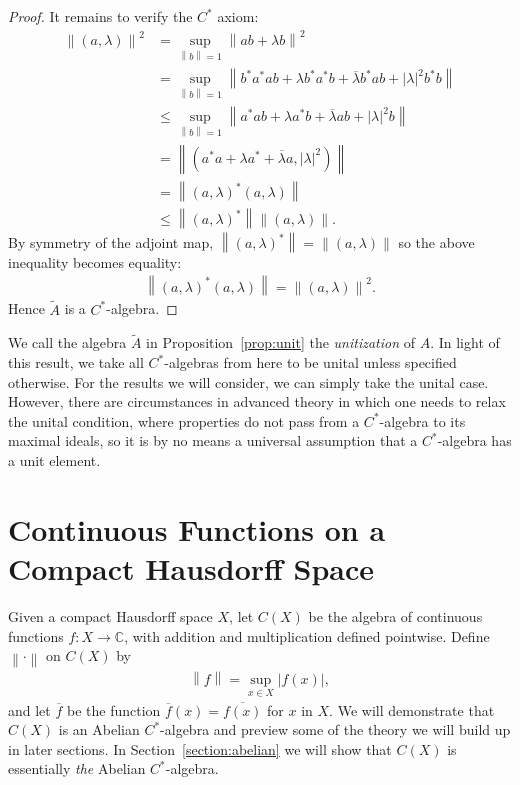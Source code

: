 \documentclass[11pt,a4paper]{report}
\theoremstyle{plain}
\theoremstyle{definition}
\newcommand{\1}{\mathbbm{1}}
\newcommand{\C}{\mathbb{C}}
\newcommand{\CX}{C(X)}
\begin{document}
\begin{proof}
	It remains to verify the $C^\ast$ axiom:
	\begin{align*}
				\left\|(a,\lambda)\right\|^2 
		&=		\sup_{\left\|b\right\|=1}{\left\| ab+\lambda b\right \|^2}						\\
		&=		\sup_{\left\|b\right\|=1}{\left\| b^\ast a^\ast ab 
								+\lambda b^\ast a^\ast b
								+\overline{\lambda}b^\ast a b 
								+|\lambda|^2 b^\ast b \right\|}									\\
		&\leq	\sup_{\left\|b\right\|=1}{\left\| a^\ast ab 
								+\lambda a^\ast b
								+\overline{\lambda}a b
								+\left|\lambda\right|^2 b\right\|}								\\
		&=		\left\|(a^\ast a + \lambda a^\ast +\overline{\lambda}a,|\lambda|^2)\right\|		\\
		&= 		\left\|(a,\lambda)^\ast(a,\lambda)\right\|										\\
		&\leq	\left\|(a,\lambda)^\ast\right\| \left\|(a,\lambda)\right\|.
	\end{align*}
	By symmetry of the adjoint map, $\left\|(a,\lambda)^\ast\right\| = \left\|(a,\lambda)\right\|$ 
	so the above inequality becomes equality:
	\begin{align*}
		\left\|(a,\lambda)^\ast(a,\lambda)\right\| = \left\|(a,\lambda)\right\|^2.
	\end{align*}
	Hence $\tilde A$ is a $C^\ast$-algebra.
\end{proof}

We call the algebra $\tilde A$ in Proposition~\ref{prop:unit} the \emph{unitization} of $A$.
In light of this result, we take all $C^\ast$-algebras from here to be unital 
unless specified otherwise. For the results we will consider, we can simply take 
the unital case. However, there are circumstances in advanced theory in which 
one needs to relax the unital condition, where properties do not pass from a 
$C^\ast$-algebra to its maximal ideals, so it is by no means a universal 
assumption that a $C^\ast$-algebra has a unit element.


\section{Continuous Functions on a Compact Hausdorff Space} \label{section:CX}
Given a compact Hausdorff space $X$, let $\CX$ be the algebra of continuous 
functions $f:X\to\C$, with addition and multiplication defined pointwise. 
Define $\left\|\cdot\right\|$ on $\CX$ by
\begin{align*}
	\left\|f\right\|= \sup_{x\in X}{\left|f(x)\right|},
\end{align*}
and let $\overline f$ be the function $\overline f(x) = \overline{f(x)}$ for 
$x$ in $X$. We will demonstrate that $\CX$ is an Abelian $C^\ast$-algebra and 
preview some of the theory we will build up in later sections. In 
Section~\ref{section:abelian} we will show that $\CX$ is essentially \emph{the} 
Abelian $C^\ast$-algebra.
\end{document}
